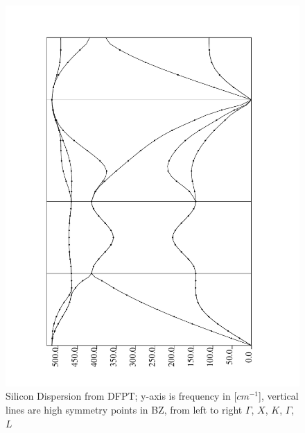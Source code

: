 \documentclass{article}
\begin{document}
\begin{figure}[h!]
\centering
\includegraphics[scale=0.4, angle=-90]{siph}
\caption{Silicon Dispersion from DFPT; y-axis is frequency in [$cm^{-1}$], vertical lines are high symmetry points in BZ, from left to right $\Gamma$, $X$, $K$, $\Gamma$, $L$}
\end{figure}
\end{document}
